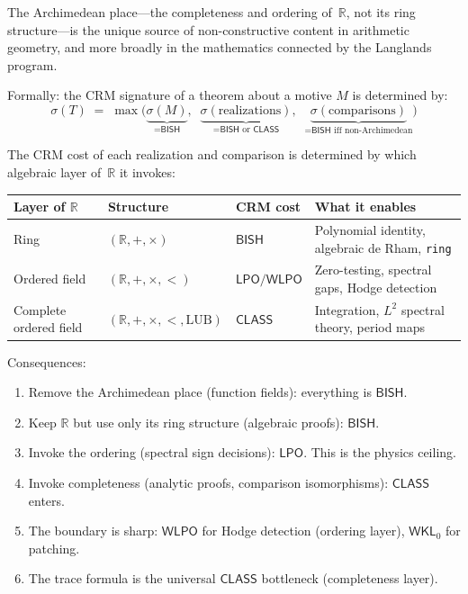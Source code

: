 \documentclass[11pt,a4paper]{article}
\theoremstyle{plain}
\theoremstyle{definition}
\newcommand{\BISH}{\textsf{BISH}}
\newcommand{\WKL}{\textsf{WKL}_0}
\newcommand{\WLPO}{\textsf{WLPO}}
\newcommand{\LPO}{\textsf{LPO}}
\newcommand{\CLASS}{\textsf{CLASS}}
\newcommand{\sig}{\sigma}
\newcommand{\R}{\mathbb{R}}
\begin{document}
\begin{tcolorbox}[colback=blue!5!white, colframe=blue!60!black, title=\textbf{The Archimedean Thesis}]
The Archimedean place---the completeness and ordering of~$\R$, not its ring structure---is the unique source of non-constructive content in arithmetic geometry, and more broadly in the mathematics connected by the Langlands program.

Formally: the CRM signature of a theorem about a motive $M$ is determined by:
\[
\sig(T) \;=\; \max\bigl(\underbrace{\sig(M)}_{= \BISH},\;\; \underbrace{\sig(\text{realizations})}_{= \BISH \text{ or } \CLASS},\;\; \underbrace{\sig(\text{comparisons})}_{= \BISH \text{ iff non-Archimedean}}\bigr)
\]

The CRM cost of each realization and comparison is determined by which algebraic layer of~$\R$ it invokes:
\begin{center}
\small
\begin{tabular}{@{}llll@{}}
\toprule
\textbf{Layer of $\R$} & \textbf{Structure} & \textbf{CRM cost} & \textbf{What it enables} \\
\midrule
Ring & $(\R, +, \times)$ & $\BISH$ & Polynomial identity, algebraic de Rham, \texttt{ring} \\
Ordered field & $(\R, +, \times, <)$ & $\LPO/\WLPO$ & Zero-testing, spectral gaps, Hodge detection \\
Complete ordered field & $(\R, +, \times, <, \mathrm{LUB})$ & $\CLASS$ & Integration, $L^2$ spectral theory, period maps \\
\bottomrule
\end{tabular}
\end{center}

Consequences:
\begin{enumerate}[label=(\arabic*)]
\item Remove the Archimedean place (function fields): everything is $\BISH$.
\item Keep $\R$ but use only its ring structure (algebraic proofs): $\BISH$.
\item Invoke the ordering (spectral sign decisions): $\LPO$. This is the physics ceiling.
\item Invoke completeness (analytic proofs, comparison isomorphisms): $\CLASS$ enters.
\item The boundary is sharp: $\WLPO$ for Hodge detection (ordering layer), $\WKL$ for patching.
\item The trace formula is the universal $\CLASS$ bottleneck (completeness layer).
\end{enumerate}
\end{tcolorbox}
\end{document}
